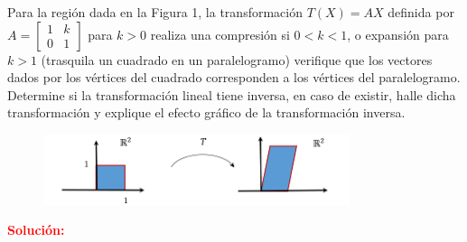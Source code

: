\documentclass[12pt]{article}
\begin{document}
Para la región dada en la Figura 1, la transformación $T(X) = AX$ definida por $A = \left[\begin{array}{cc}
    1 & k \\
    0 & 1 
\end{array}\right]$ para $k > 0$ realiza una compresión si $0<k<1$, o expansión para $k>1$ (trasquila un cuadrado en un paralelogramo) verifique que los vectores dados por los vértices del cuadrado corresponden a los vértices del paralelogramo. Determine si la transformación lineal tiene inversa, en caso de existir, halle dicha transformación y explique el efecto gráfico de la transformación inversa.
\begin{figure}[htbp]
    \centering
    \includegraphics[width=0.8\textwidth]{problema16.png}
\end{figure}

\noindent \textcolor{red}{\bf Solución:}\\
\end{document}
